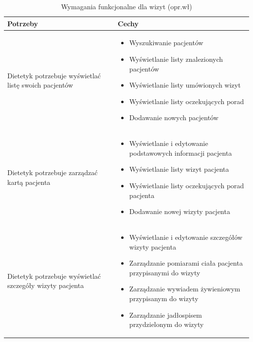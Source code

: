 \begin{minipage}{\textwidth}
    \begin{table}[H]
        \centering\caption{Wymagania funkcjonalne dla wizyt (opr.wł)\label{tabela:wymaganiaFunkcjonalneWizyty}}
        \begin{tabular}{|p{}|p{}|}
            \hline
            Potrzeby & Cechy \\

            \hline
            Dietetyk potrzebuje wyświetlać listę swoich pacjentów &
            \begin{itemize}
                \item Wyszukiwanie pacjentów
                \item Wyświetlanie listy znalezionych pacjentów
                \item Wyświetlanie listy umówionych wizyt
                \item Wyświetlanie listy oczekujących porad
                \item Dodawanie nowych pacjentów
            \end{itemize} \\
            \hline
            Dietetyk potrzebuje zarządzać kartą pacjenta &
            \begin{itemize}
                \item Wyświetlanie i edytowanie podstawowych informacji pacjenta
                \item Wyświetlanie listy wizyt pacjenta
                \item Wyświetlanie listy oczekujących porad pacjenta
                \item Dodawanie nowej wizyty pacjenta
            \end{itemize} \\
            \hline
            Dietetyk potrzebuje wyświetlać szczegóły wizyty pacjenta &
            \begin{itemize}
                \item Wyświetlanie i edytowanie szczegółów wizyty pacjenta
                \item Zarządzanie pomiarami ciała pacjenta przypisanymi do wizyty
                \item Zarządzanie wywiadem żywieniowym przypisanym do wizyty
                \item Zarządzanie jadłospisem przydzielonym do wizyty
            \end{itemize} \\

\end{tabular}
\end{table}
\end{minipage}
